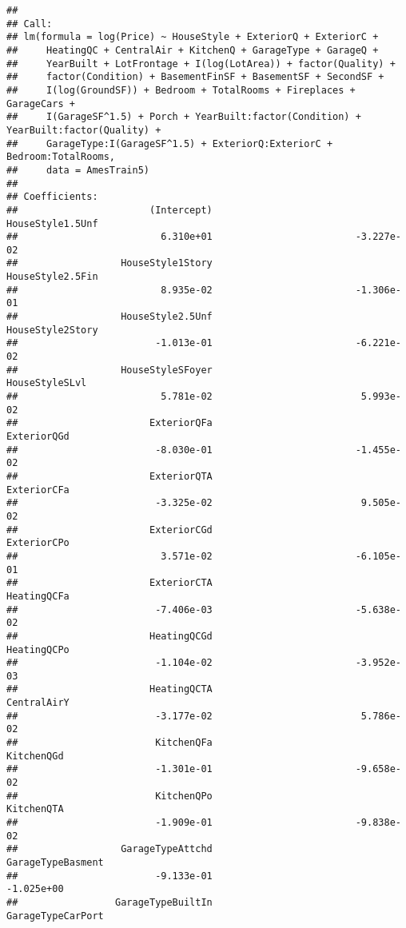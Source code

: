 \documentclass[
]{article}
\begin{document}
\begin{verbatim}
## 
## Call:
## lm(formula = log(Price) ~ HouseStyle + ExteriorQ + ExteriorC + 
##     HeatingQC + CentralAir + KitchenQ + GarageType + GarageQ + 
##     YearBuilt + LotFrontage + I(log(LotArea)) + factor(Quality) + 
##     factor(Condition) + BasementFinSF + BasementSF + SecondSF + 
##     I(log(GroundSF)) + Bedroom + TotalRooms + Fireplaces + GarageCars + 
##     I(GarageSF^1.5) + Porch + YearBuilt:factor(Condition) + YearBuilt:factor(Quality) + 
##     GarageType:I(GarageSF^1.5) + ExteriorQ:ExteriorC + Bedroom:TotalRooms, 
##     data = AmesTrain5)
## 
## Coefficients:
##                       (Intercept)                   HouseStyle1.5Unf  
##                         6.310e+01                         -3.227e-02  
##                  HouseStyle1Story                   HouseStyle2.5Fin  
##                         8.935e-02                         -1.306e-01  
##                  HouseStyle2.5Unf                   HouseStyle2Story  
##                        -1.013e-01                         -6.221e-02  
##                  HouseStyleSFoyer                     HouseStyleSLvl  
##                         5.781e-02                          5.993e-02  
##                       ExteriorQFa                        ExteriorQGd  
##                        -8.030e-01                         -1.455e-02  
##                       ExteriorQTA                        ExteriorCFa  
##                        -3.325e-02                          9.505e-02  
##                       ExteriorCGd                        ExteriorCPo  
##                         3.571e-02                         -6.105e-01  
##                       ExteriorCTA                        HeatingQCFa  
##                        -7.406e-03                         -5.638e-02  
##                       HeatingQCGd                        HeatingQCPo  
##                        -1.104e-02                         -3.952e-03  
##                       HeatingQCTA                        CentralAirY  
##                        -3.177e-02                          5.786e-02  
##                        KitchenQFa                         KitchenQGd  
##                        -1.301e-01                         -9.658e-02  
##                        KitchenQPo                         KitchenQTA  
##                        -1.909e-01                         -9.838e-02  
##                  GarageTypeAttchd                  GarageTypeBasment  
##                        -9.133e-01                         -1.025e+00  
##                 GarageTypeBuiltIn                  GarageTypeCarPort  

\end{verbatim}
\end{document}
